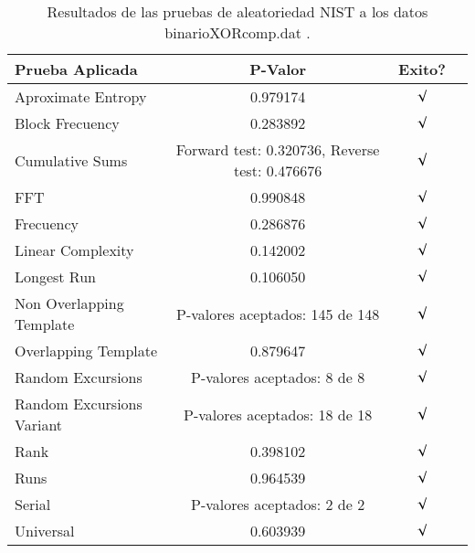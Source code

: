 \documentclass[12pt,3p]{elsarticle}
\begin{document}
\begin{table}[H]
\caption{Resultados de las pruebas de aleatoriedad NIST a los datos binarioXORcomp.dat .}
\label{sample-table}
\vskip 0.15in
\begin{center}
\begin{small}
\begin{sc}
\begin{tabular}{lccr}
\hline

Prueba Aplicada &  P-Valor & Exito? \\
\hline

Aproximate Entropy    &    0.979174  & $\surd$ \\

Block Frecuency  &  0.283892 &  $\surd$  \\

Cumulative Sums    &   Forward test:  0.320736, Reverse test: 0.476676  & $\surd$ \\

FFT    &   0.990848 &   $\surd$      \\

Frecuency     &  0.286876 &  $\surd$   \\

Linear Complexity      &  0.142002 & $\surd$ \\

Longest Run      &    0.106050 &    $\surd$      \\

Non Overlapping Template      & P-valores aceptados: 145 de 148    &     $\surd$          \\

Overlapping Template      &  0.879647  &        $\surd$       \\

Random Excursions      & P-valores aceptados: 8 de 8  &     $\surd$          \\

Random Excursions Variant & P-valores aceptados: 18 de 18  &    $\surd$        \\

Rank &    0.398102    &       $\surd$      \\

Runs &        0.964539  &     $\surd$        \\

Serial &     P-valores aceptados: 2 de 2    &     $\surd$        \\

Universal &     0.603939  &   $\surd$            \\

\hline



\end{tabular}
\end{sc}
\end{small}
\end{center}
\vskip -0.1in
\end{table}
\end{document}
